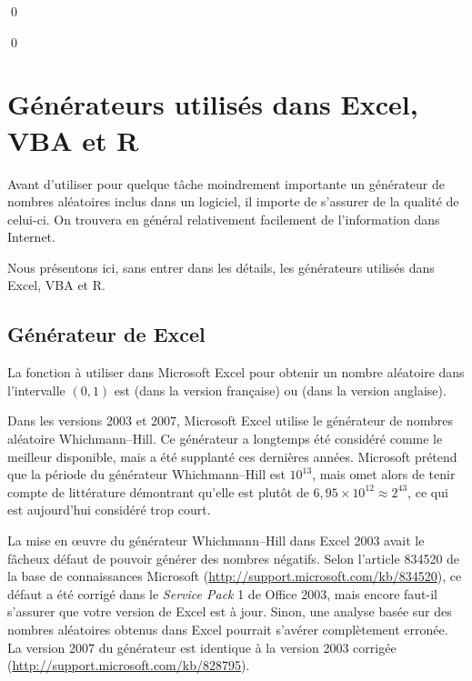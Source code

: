 \begin{exemple}
  \mbox{} \normalfont
  \qed
\end{exemple}

\begin{exemple}
  \mbox{} \normalfont
  \qed
\end{exemple}


\section{Générateurs utilisés dans Excel, VBA et R}

Avant d'utiliser pour quelque tâche moindrement importante un
générateur de nombres aléatoires inclus dans un logiciel, il importe
de s'assurer de la qualité de celui-ci. On trouvera en général
relativement facilement de l'information dans Internet.

Nous présentons ici, sans entrer dans les détails, les générateurs
utilisés dans Excel, VBA et R.

\subsection{Générateur de Excel}

La fonction à utiliser dans Microsoft Excel pour obtenir un nombre
aléatoire dans l'intervalle $(0, 1)$ est  (dans la
version française) ou  (dans la version anglaise).

Dans les versions 2003 et 2007, Microsoft Excel utilise le générateur
de nombres aléatoire Whichmann--Hill. Ce générateur a longtemps été
considéré comme le meilleur disponible, mais a été supplanté ces
dernières années. Microsoft prétend que la période du générateur
Whichmann--Hill est $10^{13}$, mais omet alors de tenir compte de
littérature démontrant qu'elle est plutôt de $6,95 \times 10^{12}
\approx 2^{43}$, ce qui est aujourd'hui considéré trop court.

\begin{sloppypar}
  La mise en {\oe}uvre du générateur Whichmann--Hill dans Excel 2003
  avait le fâcheux défaut de pouvoir générer des nombres négatifs.
  Selon l'article 834520 de la base de connaissances Microsoft
  (\url{http://support.microsoft.com/kb/834520}), ce défaut a été
  corrigé dans le \emph{Service Pack} 1 de Office 2003, mais encore
  faut-il s'assurer que votre version de Excel est à jour. Sinon, une
  analyse basée sur des nombres aléatoires obtenus dans Excel pourrait
  s'avérer complètement erronée. La version 2007 du générateur est
  identique à la version 2003 corrigée
  (\url{http://support.microsoft.com/kb/828795}).
\end{sloppypar}

